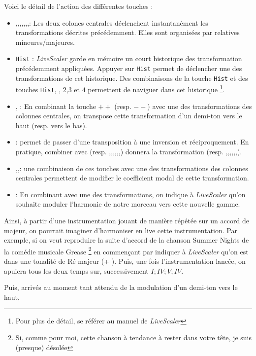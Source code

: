 Voici le détail de l'action des différentes touches : 
\begin{itemize}
  \item \LSI,\LSvi,\LSIV,\LSII,\LSV,\LSiii,\LSII,\LSvii :  Les deux colones centrales déclenchent instantanément les transformations décrites précédemment. Elles sont organisées par relatives mineures/majeures.
  \item \texttt{Hist} : \emph{LiveScaler} garde en mémoire un court historique des transformation précédemment appliquées. Appuyer sur \texttt{Hist} permet de déclencher une des transformations de cet historique. Des combinaisons de la touche \texttt{Hist} et des touches \texttt{Hist}, \LSMm, $2$,$3$ et $4$ permettent de naviguer dans cet historique \footnote{Pour plus de détail, se référer au manuel de \emph{LiveScaler}}. 
  \item \LSpp, \LSmm : En combinant la touche $++$ (resp. $--$) avec une des transformations des colonnes centrales, on transpose cette transformation d'un demi-ton vers le haut (resp. vers le bas). 
  \item  \LSMm : permet de passer d'une transposition à une inversion et réciproquement. En pratique, combiner \LSMm avec \LSI (resp. \LSvi,\LSIV,\LSII,\LSV,\LSiii,\LSII,\LSvii) donnera la transformation \LSI (resp. \LSvi,\LSIV,\LSII,\LSV,\LSiii,\LSII,\LSvii).
  \item \LStwo,\LSthree,\LSfour : une combinaison de ces touches avec une des transformations des colonnes centrales permettent de modifier le coefficient modal de cette transformation.
  \item \LSMod : En combinant \LSMod avec une des transformations, on indique à \emph{LiveScaler} qu'on souhaite moduler l'harmonie de notre morceau vers cette nouvelle gamme. 
\end{itemize}

Ainsi, à partir d'une instrumentation jouant de manière répétée sur un accord de  majeur, on pourrait imaginer d'harmoniser en live cette instrumentation. Par exemple, si on veut reproduire la suite d'accord de la chanson Summer Nights de la comédie musicale Grease \footnote{Si, comme pour moi, cette chanson à tendance à rester dans votre tête, je suis (presque) désolée} en commençant par indiquer à \emph{LiveScaler} qu'on est dans une tonalité de Ré majeur (\LSMod + \LSII). Puis, une fois l'instrumentation lancée, on apuiera tous les deux temps sur, successivement $I ; IV ; V ; IV$.

Puis, arrivés au moment tant attendu de la modulation d'un demi-ton vers le haut,

